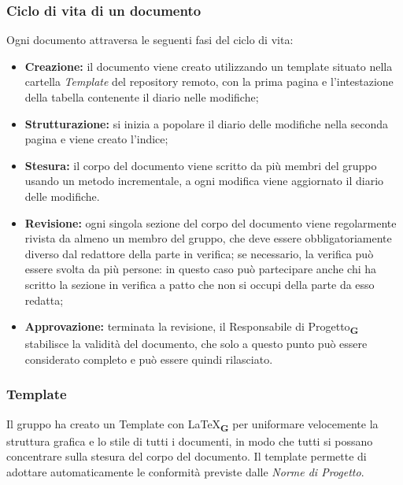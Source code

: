 \subsubsection{Ciclo di vita di un documento}
Ogni documento attraversa le seguenti fasi del ciclo di vita:
\begin{itemize}
    \item \textbf{Creazione:} il documento viene creato utilizzando un template situato nella cartella \textit{Template} del repository remoto, con la prima pagina e l'intestazione della tabella contenente il diario nelle modifiche;
    \item \textbf{Strutturazione:} si inizia a popolare il diario delle modifiche nella seconda pagina e viene creato l'indice;
    \item \textbf{Stesura:} il corpo del documento viene scritto da più membri del gruppo usando un metodo incrementale, a ogni modifica viene aggiornato il diario delle modifiche.
    \item \textbf{Revisione:} ogni singola sezione del corpo del documento viene regolarmente rivista da almeno un membro del gruppo, che deve essere obbligatoriamente diverso dal redattore della parte in verifica; se necessario, la verifica può essere svolta da più persone: in questo caso può partecipare anche chi ha scritto la sezione in verifica a patto che non si occupi della parte da esso redatta;
    \item \textbf{Approvazione:} terminata la revisione, il Responsabile di Progetto\textsubscript{\textbf{G}} stabilisce la validità del documento, che solo a questo punto può essere considerato completo e può essere quindi rilasciato.
\end{itemize}
\subsubsection{Template}
Il gruppo ha creato un Template con \LaTeX\textsubscript{\textbf{G}} per uniformare velocemente la struttura grafica e lo stile di tutti i documenti, in modo che tutti si possano concentrare sulla stesura del corpo del documento. Il template permette di adottare automaticamente le conformità previste dalle \textit{Norme di Progetto}.
